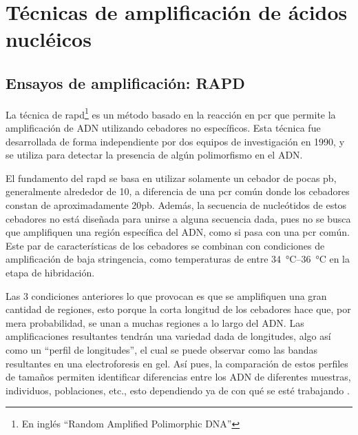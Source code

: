 \documentclass{AsignaturaResumen}
\begin{document}
    \chapter{Técnicas de amplificación de ácidos nucléicos}
\fi

    
    


\section{Ensayos de amplificación: RAPD}

La técnica de \acrfull{rapd}\footnote{En inglés ``Random Amplified Polimorphic DNA''} es un método basado en la reacción en \acrshort{pcr} que permite la amplificación de ADN utilizando cebadores no específicos. Esta técnica fue desarrollada de forma independiente por dos equipos de investigación en 1990, y se utiliza para detectar la presencia de algún \gls{polimorfismo} en el ADN\citep{welshFingerprintingGenomesUsing1990,williamsDNAPolymorphismsAmplified1990}.

El fundamento del \acrshort{rapd} se basa en utilizar solamente un cebador de pocas \acrfull{pb}, generalmente alrededor de 10, a diferencia de una \acrshort{pcr} común donde los cebadores constan de aproximadamente 20\acrshort{pb}. Además, la secuencia de nucleótidos de estos cebadores no está diseñada para unirse a alguna secuencia dada, pues no se busca que amplifiquen una región específica del ADN, como si pasa con una \acrshort{pcr} común. Este par de características de los cebadores se combinan con condiciones de amplificación de baja stringencia, como temperaturas de entre \qtyrange{34}{36}{\degreeCelsius} en la etapa de hibridación. 

Las 3 condiciones anteriores lo que provocan es que se amplifiquen una gran cantidad de regiones, esto porque la corta longitud de los cebadores hace que, por mera probabilidad, se unan a muchas regiones a lo largo del ADN. Las amplificaciones resultantes tendrán una variedad dada de longitudes, algo así como un ``perfil de longitudes'', el cual se puede observar como las bandas resultantes en una electroforesis en gel. Así pues, la comparación de estos perfiles de tamaños permiten identificar diferencias entre los ADN de diferentes muestras, individuos, poblaciones, etc., esto dependiendo ya de con qué se esté trabajando \citep{kumariRandomlyAmplifiedPolymorphic2014, atienzarRandomAmplifiedPolymorphic2006}.
\end{document}
